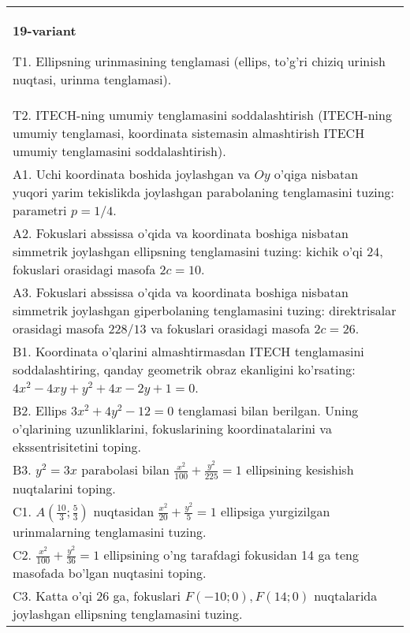 \documentclass{article}
\begin{document}
\begin{tabular}{m{17cm}}
\textbf{19-variant}
\newline

T1. Ellipsning urinmasining tenglamasi (ellips, to'g'ri chiziq urinish nuqtasi, urinma tenglamasi).\\

T2. ITECH-ning umumiy tenglamasini soddalashtirish (ITECH-ning umumiy tenglamasi, koordinata sistemasin almashtirish ITECH umumiy tenglamasini soddalashtirish).\\

A1. Uchi koordinata boshida joylashgan va $Oy$ o'qiga nisbatan yuqori yarim tekislikda joylashgan parabolaning tenglamasini tuzing: parametri $p=1/4$.\\

A2. Fokuslari abssissa o'qida va koordinata boshiga nisbatan simmetrik joylashgan ellipsning tenglamasini tuzing: kichik o'qi $24$, fokuslari orasidagi masofa $2c=10$.\\

A3. Fokuslari abssissa o'qida va koordinata boshiga nisbatan simmetrik joylashgan giperbolaning tenglamasini tuzing: direktrisalar orasidagi masofa $228/13$ va fokuslari orasidagi masofa $2c=26$.\\

B1. Koordinata o'qlarini almashtirmasdan ITECH tenglamasini soddalashtiring, qanday geometrik obraz ekanligini ko'rsating: $4x^{2} - 4xy + y^{2} + 4x - 2y + 1 = 0$.  \\

B2. Ellips $3x^{2} + 4y^{2} - 12 = 0$ tenglamasi bilan berilgan. Uning o'qlarining uzunliklarini, fokuslarining koordinatalarini va ekssentrisitetini toping.  \\

B3. $y^{2} = 3x$ parabolasi bilan $\frac{x^{2}}{100} + \frac{y^{2}}{225} = 1$ ellipsining kesishish nuqtalarini toping.  \\

C1. $A(\frac{10}{3};\frac{5}{3})$ nuqtasidan $\frac{x^{2}}{20} + \frac{y^{2}}{5} = 1$ ellipsiga yurgizilgan urinmalarning tenglamasini tuzing.  \\

C2. $\frac{x^{2}}{100} + \frac{y^{2}}{36} = 1$ ellipsining o'ng tarafdagi fokusidan 14 ga teng masofada bo'lgan nuqtasini toping.  \\

C3. Katta o'qi 26 ga, fokuslari $F( - 10;0), F(14;0)$ nuqtalarida joylashgan ellipsning tenglamasini tuzing.  \\

\end{tabular}
\vspace{1cm}
\end{document}
